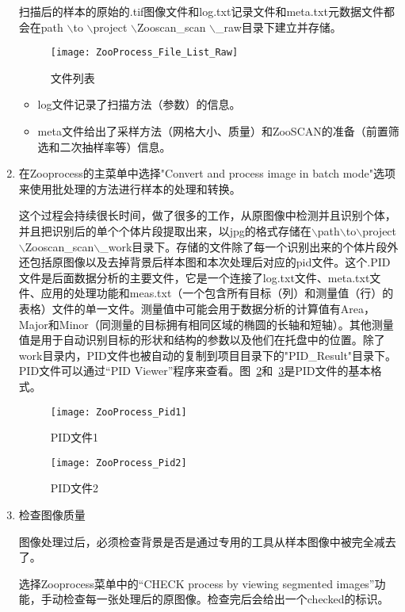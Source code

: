 \begin{enumerate}
				扫描后的样本的原始的.tif图像文件和log.txt记录文件和meta.txt元数据文件都会在path $\backslash$to $\backslash$project $\backslash$Zooscan\_scan $\backslash$\_raw目录下建立并存储。
				\begin{figure}[!ht]
    					\centering
    					\texttt{[image: ZooProcess\_File\_List\_Raw]}
    					\caption{文件列表}
    					\label{fig:FileListRaw}
    				\end{figure}
				\begin{itemize}
					\item log文件记录了扫描方法（参数）的信息。
					\item meta文件给出了采样方法（网格大小、质量）和ZooSCAN的准备（前置筛选和二次抽样率等）信息。
				\end{itemize}
			\item 在Zooprocess的主菜单中选择"Convert and process image in batch mode"选项来使用批处理的方法进行样本的处理和转换。
			
				这个过程会持续很长时间，做了很多的工作，从原图像中检测并且识别个体，并且把识别后的单个个体片段提取出来，以jpg的格式存储在$\backslash$path$\backslash$to$\backslash$project$\backslash$Zooscan\_scan$\backslash$\_work目录下。存储的文件除了每一个识别出来的个体片段外还包括原图像以及去掉背景后样本图和本次处理后对应的pid文件。这个.PID文件是后面数据分析的主要文件，它是一个连接了log.txt文件、meta.txt文件、应用的处理功能和meas.txt（一个包含所有目标（列）和测量值（行）的表格）文件的单一文件。测量值中可能会用于数据分析的计算值有Area，Major和Minor（同测量的目标拥有相同区域的椭圆的长轴和短轴）。其他测量值是用于自动识别目标的形状和结构的参数以及他们在托盘中的位置。除了work目录内，PID文件也被自动的复制到项目目录下的"PID\_Result"目录下。PID文件可以通过“PID Viewer”程序来查看。图~\ref{fig:Pid1}和~\ref{fig:Pid2}是PID文件的基本格式。
				\begin{figure}[!ht]
    					\centering
    					\texttt{[image: ZooProcess\_Pid1]}
    					\caption{PID文件1}
    					\label{fig:Pid1}
    				\end{figure}
				\begin{figure}[!ht]
    					\centering
    					\texttt{[image: ZooProcess\_Pid2]}
    					\caption{PID文件2}
    					\label{fig:Pid2}
    				\end{figure}
			\item 检查图像质量
				
				图像处理过后，必须检查背景是否是通过专用的工具从样本图像中被完全减去了。
	
				选择Zooprocess菜单中的“CHECK process by viewing segmented images”功能，手动检查每一张处理后的原图像。检查完后会给出一个checked的标识。


\end{enumerate}
